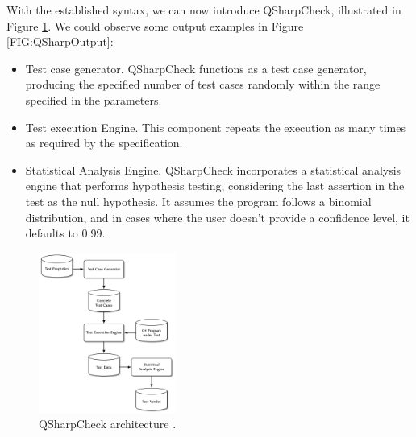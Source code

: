 \begin{itemize}
With the established syntax, we can now introduce QSharpCheck, illustrated in Figure \ref{Fig:QSharpArch}. We could observe some output examples in Figure \ref{FIG:QSharpOutput}:

\begin{itemize}
    \item Test case generator. QSharpCheck functions as a test case generator, producing the specified number of test cases randomly within the range specified in the parameters.
    \item Test execution Engine. This component repeats the execution as many times as required by the specification.
    \item Statistical Analysis Engine. QSharpCheck incorporates a statistical analysis engine that performs hypothesis testing, considering the last assertion in the test as the null hypothesis. It assumes the program follows a binomial distribution, and in cases where the user doesn't provide a confidence level, it defaults to 0.99.
\end{itemize}

\begin{figure}[H]
        \centering
        \includegraphics[width=0.4\textwidth]{TFM/photos/QSharpOverview.png}
        \caption{QSharpCheck architecture \cite{honarvar2020property}.} 
        \label{Fig:QSharpArch}
\end{figure}


\end{itemize}
